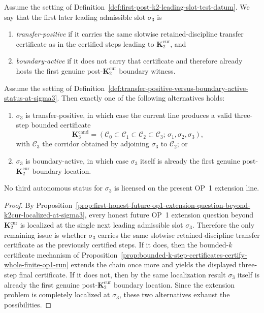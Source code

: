 \begin{definition}
\label{def:transfer-positive-versus-boundary-active-status-at-sigma3}
Assume the setting of Definition~\ref{def:first-post-k2-leading-slot-test-datum}. We say that the first later leading admissible slot $\sigma_3$ is
\begin{enumerate}[label=(\roman*)]
 \item \emph{transfer-positive} if it carries the same slotwise retained-discipline transfer certificate as in the certified steps leading to $\mathbf K_2^{\mathrm{cur}}$, and
 \item \emph{boundary-active} if it does not carry that certificate and therefore already hosts the first genuine post-$\mathbf K_2^{\mathrm{cur}}$ boundary witness.
\end{enumerate}
\end{definition}

\begin{proposition}
\label{prop:post-k2-slot-sigma3-admits-only-transfer-positive-or-boundary-active-status}
Assume the setting of Definition~\ref{def:transfer-positive-versus-boundary-active-status-at-sigma3}. Then exactly one of the following alternatives holds:
\begin{enumerate}[label=(\roman*)]
 \item $\sigma_3$ is transfer-positive, in which case the current line produces a valid three-step bounded certificate
 \[
 \mathbf K_3^{\mathrm{cand}}=(\mathcal C_0\subset \mathcal C_1\subset \mathcal C_2\subset \mathcal C_3;\,\sigma_1,\sigma_2,\sigma_3),
 \]
 with $\mathcal C_3$ the corridor obtained by adjoining $\sigma_3$ to $\mathcal C_2$; or
 \item $\sigma_3$ is boundary-active, in which case $\sigma_3$ itself is already the first genuine post-$\mathbf K_2^{\mathrm{cur}}$ boundary location.
\end{enumerate}
No third autonomous status for $\sigma_3$ is licensed on the present OP~1 extension line.
\end{proposition}

\begin{proof}
By Proposition~\ref{prop:first-honest-future-op1-extension-question-beyond-k2cur-localized-at-sigma3}, every honest future OP~1 extension question beyond $\mathbf K_2^{\mathrm{cur}}$ is localized at the single next leading admissible slot $\sigma_3$. Therefore the only remaining issue is whether $\sigma_3$ carries the same slotwise retained-discipline transfer certificate as the previously certified steps. If it does, then the bounded-$k$ certificate mechanism of Proposition~\ref{prop:bounded-k-step-certificates-certify-whole-finite-op1-run} extends the chain once more and yields the displayed three-step final certificate. If it does not, then by the same localization result $\sigma_3$ itself is already the first genuine post-$\mathbf K_2^{\mathrm{cur}}$ boundary location. Since the extension problem is completely localized at $\sigma_3$, these two alternatives exhaust the possibilities.
\end{proof}


